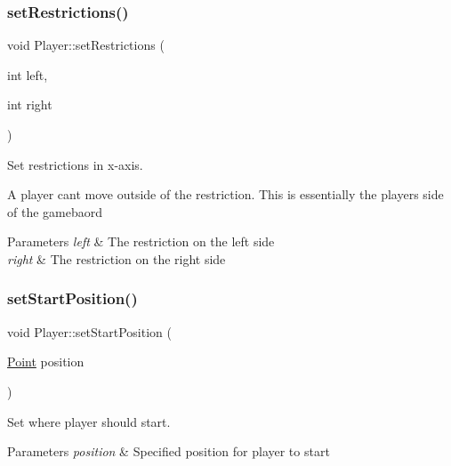 \subsubsection{\texorpdfstring{set\+Restrictions()}{setRestrictions()}\hspace{0.1cm}{\footnotesize\ttfamily [2/2]}}
{\footnotesize\ttfamily void Player\+::set\+Restrictions (\begin{DoxyParamCaption}\item[{int}]{left,  }\item[{int}]{right }\end{DoxyParamCaption})}



Set restrictions in x-\/axis. 

A player can\textquotesingle{}t move outside of the restriction. This is essentially the player\textquotesingle{}s side of the gamebaord 
\begin{DoxyParams}{Parameters}
{\em left} & The restriction on the left side \\
\hline
{\em right} & The restriction on the right side \\
\hline
\end{DoxyParams}
\mbox{\label{classPlayer_ad61f1f07cc8e7faed52cd055a98a03d3}} 
\subsubsection{\texorpdfstring{set\+Start\+Position()}{setStartPosition()}\hspace{0.1cm}{\footnotesize\ttfamily [1/2]}}
{\footnotesize\ttfamily void Player\+::set\+Start\+Position (\begin{DoxyParamCaption}\item[{\hyperlink{structPoint}{Point}}]{position }\end{DoxyParamCaption})}



Set where player should start. 


\begin{DoxyParams}{Parameters}
{\em position} & Specified position for player to start \\
\hline
\end{DoxyParams}
\mbox{\label{classPlayer_a278252ff033b18ee6a5d9f2da5ca4fe0}} 
